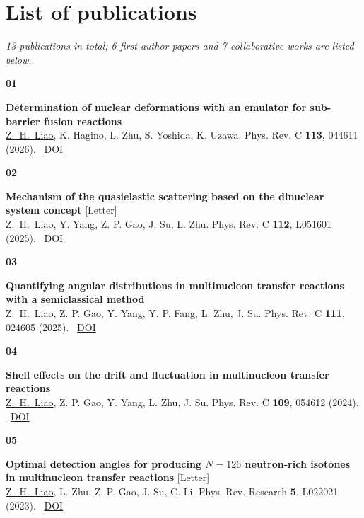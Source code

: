 \documentclass[10pt]{article}
\newlength{\numcol}
\newcommand{\cvnum}[2]{%
  \noindent\begin{minipage}[t]{\numcol}\color{accent}\bfseries #1\end{minipage}%
  \begin{minipage}[t]{\dimexpr\linewidth-\numcol\relax}#2\end{minipage}\par\vspace{7pt}%
}
\begin{document}
\pagestyle{fancy}
\fancyhf{}
\renewcommand{\headrulewidth}{0pt}

\newpage
\section*{List of publications}
\textit{13 publications in total; 6 first-author papers and 7 collaborative works
are listed below.}
\vspace{5pt}

\cvnum{01}{\textbf{Determination of nuclear deformations with an emulator for sub-barrier fusion
  reactions} \\
  \underline{Z.~H.~Liao}, K. Hagino, L. Zhu, S. Yoshida, K. Uzawa.
  Phys. Rev. C \textbf{113}, 044611 (2026).
  \textperiodcentered\ \href{https://journals.aps.org/prc/abstract/10.1103/8ycb-lrqq}{DOI}}

\cvnum{02}{\textbf{Mechanism of the quasielastic scattering based on the dinuclear system concept}
  \textcolor{accent}{[Letter]}\\
  \underline{Z.~H.~Liao}, Y. Yang, Z. P. Gao, J. Su, L. Zhu.
  Phys. Rev. C \textbf{112}, L051601 (2025).
  \textperiodcentered\ \href{https://doi.org/10.1103/yfkd-w7gs}{DOI}}

\cvnum{03}{\textbf{Quantifying angular distributions in multinucleon transfer reactions with a
  semiclassical method} \\
   \underline{Z.~H.~Liao}, Z. P. Gao, Y. Yang, Y. P. Fang, L. Zhu, J. Su.
  Phys. Rev. C \textbf{111}, 024605 (2025).
  \textperiodcentered\ \href{https://journals.aps.org/prc/abstract/10.1103/PhysRevC.111.024605}{DOI}}

\cvnum{04}{\textbf{Shell effects on the drift and fluctuation in multinucleon transfer reactions}
  \\
  \underline{Z.~H.~Liao}, Z. P. Gao, Y. Yang, L. Zhu, J. Su.
  Phys. Rev. C \textbf{109}, 054612 (2024).
  \textperiodcentered\ \href{https://journals.aps.org/prc/abstract/10.1103/PhysRevC.109.054612}{DOI}}

\cvnum{05}{\textbf{Optimal detection angles for producing $N=126$ neutron-rich isotones in
  multinucleon transfer reactions} \textcolor{accent}{[Letter]}\\
  \underline{Z.~H.~Liao}, L. Zhu, Z. P. Gao, J. Su, C. Li.
  Phys. Rev. Research \textbf{5}, L022021 (2023).
  \textperiodcentered\ \href{https://journals.aps.org/prresearch/abstract/10.1103/PhysRevResearch.5.L022021}{DOI}}
\end{document}
